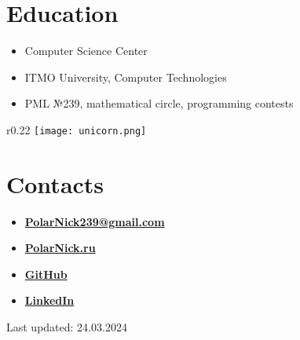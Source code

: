 \documentclass[11pt,oneside]{article}
\newcommand{\hhref}[2]{\href{#1}{\color{blue}#2}}
\begin{document}
\vspace{-9pt}
\section*{\textbf{Education}}
\vspace{-9pt}

\begin{itemize}
    \item{Computer Science Center}
    \item{ITMO University, Computer Technologies}
    \item{PML №239, mathematical circle, programming contests}
\end{itemize}

\begin{wrapfigure}{r}{0.22\textwidth}
    \centering
    \texttt{[image: unicorn.png]}
\end{wrapfigure}

\vspace{-9pt}
\section*{\textbf{Contacts}}
\vspace{-9pt}

\begin{itemize}

    \item{\textbf{\hhref{mailto:PolarNick239@gmail.com}{PolarNick239@gmail.com}}}

    \item{\textbf{\hhref{http://polarnick239.github.io/index_ru.html}{PolarNick.ru}}}

    \item{\textbf{\hhref{https://github.com/PolarNick239}{GitHub}}}

    \item{\textbf{\hhref{https://www.linkedin.com/in/nikolai-poliarnyi-61393b7b}{LinkedIn}}}

\end{itemize}

Last updated: 24.03.2024
\end{document}

